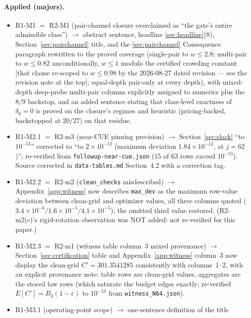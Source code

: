 \documentclass[11pt]{article}
\theoremstyle{plain}
\theoremstyle{definition}
\theoremstyle{remark}
\begin{document}
\paragraph{Applied (majors).}

\begin{itemize}
\item R1-M1 $=$ R2-M1 (pair-channel closure overclaimed as ``the gate's entire
  admissible class'') $\to$ abstract sentence, headline
  \ref{sec:headline}(8), Section~\ref{sec:pairchannel} title, and the
  \ref{sec:pairchannel} Consequence paragraph rewritten to the proved coverage
  (single-pair to $w \le 2.8$; multi-pair to $w \le 0.82$ unconditionally,
  $w \le 1$ modulo the certified crowding constant [that clause re-scoped to
  $w \le 0.98$ by the 2026-08-27 dated revision --- see the revision note at the
  top]; equal-depth pair-only at every depth), with mixed-depth deep-probe
  multi-pair columns explicitly assigned to numerics plus the $8/9$ backstop, and
  an added sentence stating that class-level exactness of $\delta_0 = 0$ is
  proved on the closure's regimes and heuristic (pricing-backed, backstopped at
  $20/27$) on that residue.
\item R1-M2.1 $=$ R2-m3 (near-CUE pinning precision) $\to$
  Section~\ref{sec:slack} ``to $10^{-13}$'' corrected to ``to
  $2 \times 10^{-12}$ (maximum deviation $1.84 \times 10^{-12}$, at $j = 62$)'';
  re-verified from \texttt{followup-near-cue.json} ($15$ of $63$ rows exceed
  $10^{-13}$). Source corrected in \texttt{data-tables.md} Section~4.2 with a
  correction tag.
\item R1-M2.2 $=$ R2-m2 (\texttt{clean\_checks} misdescribed) $\to$
  Appendix~\ref{app:witness} now describes \texttt{max\_dev} as the maximum
  row-value deviation between clean-grid and optimizer values, all three columns
  quoted ($3.4 \times 10^{-6} / 1.6 \times 10^{-5} / 4.1 \times 10^{-5}$); the
  omitted third value restored. (R2-m2(c)'s rigid-rotation observation was NOT
  added: not re-verified for this paper.)
\item R1-M2.3 $=$ R2-m1 (witness table column~3 mixed provenance) $\to$
  Section~\ref{sec:certification} table and Appendix~\ref{app:witness} column~3
  now display the clean-grid $C' = 301.3541285$ consistently with columns~1--2,
  with an explicit provenance note: table rows are clean-grid values, aggregates
  are the stored law rows (which saturate the budget edges exactly; re-verified
  $E[C'] = B_3(1 - \varepsilon)$ to $10^{-13}$ from \texttt{witness\_N64.json}).
\item R1-M3.1 (operating-point scope) $\to$ one-sentence definition of the title

\end{itemize}
\end{document}
